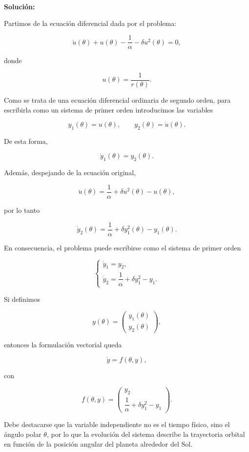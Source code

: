\documentclass[10pt,a4paper]{article}
\newenvironment{solution}{\par\noindent\textbf{Solución: } }{}
\begin{document}
\begin{solution}

Partimos de la ecuación diferencial dada por el problema:

\[
\ddot{u}(\theta) + u(\theta) - \frac{1}{\alpha} - \delta u^2(\theta)=0,
\]

donde

\[
u(\theta)=\frac{1}{r(\theta)}.
\]

Como se trata de una ecuación diferencial ordinaria de segundo orden, para escribirla como un sistema de primer orden introducimos las variables

\[
y_1(\theta)=u(\theta),
\qquad
y_2(\theta)=\dot{u}(\theta).
\]

De esta forma,

\[
\dot{y}_1(\theta)=y_2(\theta).
\]

Además, despejando de la ecuación original,

\[
\ddot{u}(\theta)=\frac{1}{\alpha}+\delta u^2(\theta)-u(\theta),
\]

por lo tanto

\[
\dot{y}_2(\theta)=\frac{1}{\alpha}+\delta y_1^2(\theta)-y_1(\theta).
\]

En consecuencia, el problema puede escribirse como el sistema de primer orden

\[
\begin{cases}
\dot{y}_1 = y_2, \\[0.2cm]
\dot{y}_2 = \dfrac{1}{\alpha} + \delta y_1^2 - y_1.
\end{cases}
\]

Si definimos

\[
y(\theta)=
\begin{pmatrix}
y_1(\theta) \\
y_2(\theta)
\end{pmatrix},
\]

entonces la formulación vectorial queda

\[
\dot{y}=f(\theta,y),
\]

con

\[
f(\theta,y)=
\begin{pmatrix}
y_2 \\
\dfrac{1}{\alpha}+\delta y_1^2-y_1
\end{pmatrix}.
\]

Debe destacarse que la variable independiente no es el tiempo físico, sino el ángulo polar $\theta$, por lo que la evolución del sistema describe la trayectoria orbital en función de la posición angular del planeta alrededor del Sol.


\end{solution}
\end{document}
